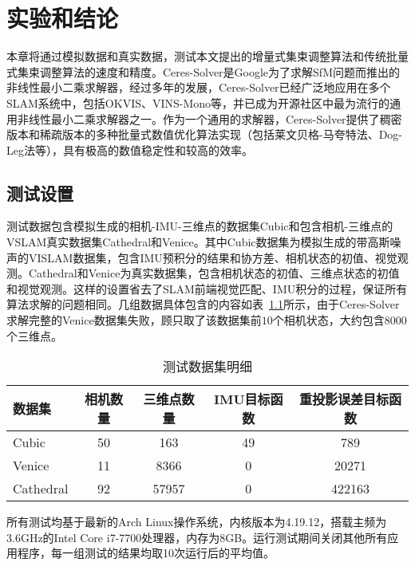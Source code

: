 \chapter{实验和结论}\label{ch:exp}

本章将通过模拟数据和真实数据，测试本文提出的增量式集束调整算法和传统批量式集束调整算法的速度和精度。Ceres-Solver是Google为了求解SfM问题而推出的非线性最小二乘求解器，经过多年的发展，Ceres-Solver已经广泛地应用在多个SLAM系统中，包括OKVIS、VINS-Mono等，并已成为开源社区中最为流行的通用非线性最小二乘求解器之一。作为一个通用的求解器，Ceres-Solver提供了稠密版本和稀疏版本的多种批量式数值优化算法实现（包括莱文贝格-马夸特法、Dog-Leg法等），具有极高的数值稳定性和较高的效率。

\section{测试设置}

测试数据包含模拟生成的相机-IMU-三维点的数据集Cubic和包含相机-三维点的VSLAM真实数据集Cathedral\citep{kim2014influence}和Venice\citep{kummerle2011g}。其中Cubic数据集为模拟生成的带高斯噪声的VISLAM数据集，包含IMU预积分的结果和协方差、相机状态的初值、视觉观测。Cathedral和Venice为真实数据集，包含相机状态的初值、三维点状态的初值和视觉观测。这样的设置省去了SLAM前端视觉匹配、IMU积分的过程，保证所有算法求解的问题相同。几组数据具体包含的内容如表~\ref{tab:dataset}所示，由于Ceres-Solver求解完整的Venice数据集失败，顾只取了该数据集前$10$个相机状态，大约包含$8000$个三维点。

{
\linespread{1}
\begin{table}[htb!]
\caption{测试数据集明细}
\label{tab:dataset}
\centering
\begin{tabular}{l|cccc}
    \toprule
    数据集    & 相机数量 & 三维点数量 & IMU目标函数 & 重投影误差目标函数 \\ \midrule
    Cubic     &       50 &        163 &          49 &                789 \\
    Venice    &       11 &       8366 &           0 &              20271 \\
    Cathedral &       92 &      57957 &           0 &             422163 \\
    \bottomrule
\end{tabular}
\end{table}
}

所有测试均基于最新的Arch Linux操作系统，内核版本为4.19.12，搭载主频为3.6GHz的Intel Core i7-7700处理器，内存为8GB。运行测试期间关闭其他所有应用程序，每一组测试的结果均取10次运行后的平均值。

